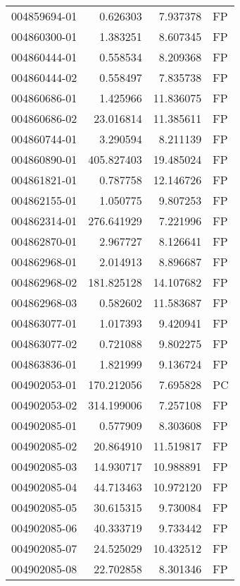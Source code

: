 \begin{tabular}{lrrl}
004859694-01 &    0.626303 &       7.937378 &   FP \\
004860300-01 &    1.383251 &       8.607345 &   FP \\
004860444-01 &    0.558534 &       8.209368 &   FP \\
004860444-02 &    0.558497 &       7.835738 &   FP \\
004860686-01 &    1.425966 &      11.836075 &   FP \\
004860686-02 &   23.016814 &      11.385611 &   FP \\
004860744-01 &    3.290594 &       8.211139 &   FP \\
004860890-01 &  405.827403 &      19.485024 &   FP \\
004861821-01 &    0.787758 &      12.146726 &   FP \\
004862155-01 &    1.050775 &       9.807253 &   FP \\
004862314-01 &  276.641929 &       7.221996 &   FP \\
004862870-01 &    2.967727 &       8.126641 &   FP \\
004862968-01 &    2.014913 &       8.896687 &   FP \\
004862968-02 &  181.825128 &      14.107682 &   FP \\
004862968-03 &    0.582602 &      11.583687 &   FP \\
004863077-01 &    1.017393 &       9.420941 &   FP \\
004863077-02 &    0.721088 &       9.802275 &   FP \\
004863836-01 &    1.821999 &       9.136724 &   FP \\
004902053-01 &  170.212056 &       7.695828 &   PC \\
004902053-02 &  314.199006 &       7.257108 &   FP \\
004902085-01 &    0.577909 &       8.303608 &   FP \\
004902085-02 &   20.864910 &      11.519817 &   FP \\
004902085-03 &   14.930717 &      10.988891 &   FP \\
004902085-04 &   44.713463 &      10.972120 &   FP \\
004902085-05 &   30.615315 &       9.730084 &   FP \\
004902085-06 &   40.333719 &       9.733442 &   FP \\
004902085-07 &   24.525029 &      10.432512 &   FP \\
004902085-08 &   22.702858 &       8.301346 &   FP \\

\end{tabular}
